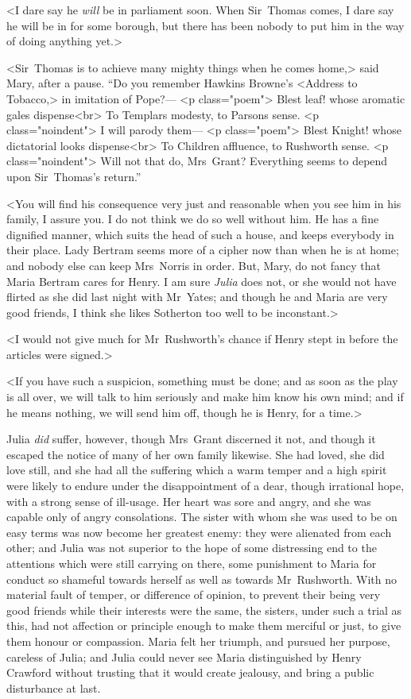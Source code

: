 <I dare say he \textit{will}  be in parliament soon. When Sir~Thomas comes, I dare say he will be in for some borough, but there has been nobody to put him in the way of doing anything yet.>

<Sir~Thomas is to achieve many mighty things when he comes home,> said Mary, after a pause. “Do you remember Hawkins Browne's <Address to Tobacco,> in imitation of Pope?—  <p class="poem"> Blest leaf! whose aromatic gales dispense<br> To Templars modesty, to Parsons sense.  <p class="noindent"> I will parody them—  <p class="poem"> Blest Knight! whose dictatorial looks dispense<br> To Children affluence, to Rushworth sense.  <p class="noindent"> Will not that do, Mrs~Grant? Everything seems to depend upon Sir~Thomas's return.”

<You will find his consequence very just and reasonable when you see him in his family, I assure you. I do not think we do so well without him. He has a fine dignified manner, which suits the head of such a house, and keeps everybody in their place. Lady Bertram seems more of a cipher now than when he is at home; and nobody else can keep Mrs~Norris in order. But, Mary, do not fancy that Maria Bertram cares for Henry. I am sure \textit{Julia}  does not, or she would not have flirted as she did last night with Mr~Yates; and though he and Maria are very good friends, I think she likes Sotherton too well to be inconstant.>

<I would not give much for Mr~Rushworth's chance if Henry stept in before the articles were signed.>

<If you have such a suspicion, something must be done; and as soon as the play is all over, we will talk to him seriously and make him know his own mind; and if he means nothing, we will send him off, though he is Henry, for a time.>

Julia \textit{did}  suffer, however, though Mrs~Grant discerned it not, and though it escaped the notice of many of her own family likewise. She had loved, she did love still, and she had all the suffering which a warm temper and a high spirit were likely to endure under the disappointment of a dear, though irrational hope, with a strong sense of ill-usage. Her heart was sore and angry, and she was capable only of angry consolations. The sister with whom she was used to be on easy terms was now become her greatest enemy: they were alienated from each other; and Julia was not superior to the hope of some distressing end to the attentions which were still carrying on there, some punishment to Maria for conduct so shameful towards herself as well as towards Mr~Rushworth. With no material fault of temper, or difference of opinion, to prevent their being very good friends while their interests were the same, the sisters, under such a trial as this, had not affection or principle enough to make them merciful or just, to give them honour or compassion. Maria felt her triumph, and pursued her purpose, careless of Julia; and Julia could never see Maria distinguished by Henry Crawford without trusting that it would create jealousy, and bring a public disturbance at last.

